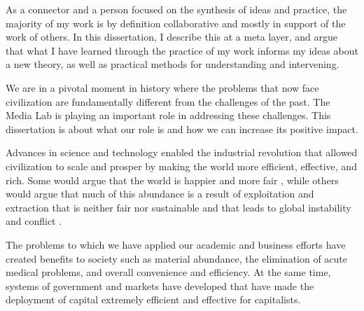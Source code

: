 As a connector and a person focused on the synthesis of ideas and practice, the majority of my work is by definition collaborative and mostly in support of the work of others. In this dissertation, I describe this at a meta layer, and argue that what I have learned through the practice of my work informs my ideas about a new theory, as well as practical methods for understanding and intervening.

We are in a pivotal moment in history where the problems that now face civilization are fundamentally different from the challenges of the past. The Media Lab is playing an important role in addressing these challenges. This dissertation is about what our role is and how we can increase its positive impact.

Advances in science and technology enabled the industrial revolution that allowed civilization to scale and prosper by making the world more efficient, effective, and rich. Some would argue that the world is happier and more fair \cite{pinker_better_2012}, while others would argue that much of this abundance is a result of exploitation and extraction that is neither fair nor sustainable and that leads to global instability and conflict \cite{cronin2009exploiting}.

The problems to which we have applied our academic and business efforts have created benefits to society such as material abundance, the elimination of acute medical problems, and overall convenience and efficiency. At the same time, systems of government and markets have developed that have made the deployment of capital extremely efficient and effective for capitalists.

